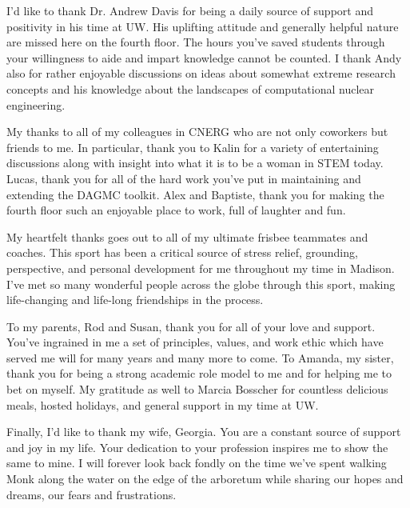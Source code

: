 I'd like to thank Dr. Andrew Davis for being a daily source of support and
positivity in his time at UW. His uplifting attitude and generally helpful
nature are missed here on the fourth floor. The hours you've saved students through
your willingness to aide and impart knowledge cannot be counted. I thank Andy
also for rather enjoyable discussions on ideas about somewhat extreme research
concepts and his knowledge about the landscapes of computational nuclear
engineering.

My thanks to all of my colleagues in CNERG who are not only coworkers but
friends to me. In particular, thank you to Kalin for a variety of entertaining
discussions along with insight into what it is to be a woman in STEM
today. Lucas, thank you for all of the hard work you've put in maintaining and
extending the DAGMC toolkit. Alex and Baptiste, thank you for making the fourth
floor such an enjoyable place to work, full of laughter and fun.

My heartfelt thanks goes out to all of my ultimate frisbee teammates and
coaches. This sport has been a critical source of stress relief, grounding,
perspective, and personal development for me throughout my time in Madison. I've
met so many wonderful people across the globe through this sport, making
life-changing and life-long friendships in the process.

To my parents, Rod and Susan, thank you for all of your love and support. You've
ingrained in me a set of principles, values, and work ethic which have served me
will for many years and many more to come. To Amanda, my sister, thank you for
being a strong academic role model to me and for helping me to bet on myself. My
gratitude as well to Marcia Bosscher for countless delicious meals, hosted
holidays, and general support in my time at UW.

Finally, I'd like to thank my wife, Georgia. You are a constant source of
support and joy in my life. Your dedication to your profession inspires me to
show the same to mine. I will forever look back fondly on the time we've spent
walking Monk along the water on the edge of the arboretum while sharing our
hopes and dreams, our fears and frustrations.
